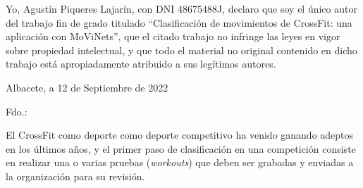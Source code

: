 %
% 






\clearpage
\thispagestyle{plain}
\setcounter{page}{1} \null
\begin{center}
\Large{}
\end{center}
\vskip1cm

Yo, Agustín Piqueres Lajarín, con DNI 48675488J, declaro que soy el único autor del trabajo fin de grado titulado ``Clasificación de movimientos de CrossFit:
una aplicación con MoViNets'', que el citado trabajo no infringe las leyes en vigor sobre propiedad intelectual, y que todo el material no original contenido en dicho trabajo está apropiadamente atribuido a sus legítimos autores.

\vspace*{2cm}
\begin{center}
Albacete, a 12 de Septiembre de 2022

\vskip3cm

Fdo.: \autor
\end{center}


\clearpage
\thispagestyle{plain}
\begin{center}
\Large{}
\end{center}
\vskip1cm

El CrossFit como deporte como deporte competitivo ha venido ganando adeptos en los últimos años, y el primer paso de clasificación en una competición consiste en realizar una o varias pruebas (\textit{workouts}) que deben ser grabadas y enviadas a la organización para su revisión.

